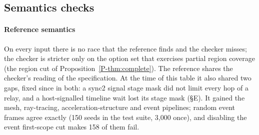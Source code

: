 \documentclass[acmtog,anonymous,review]{acmart}
\begin{document}
\subsection{Semantics checks}
\label{sec:eval-sem}

\begin{table}[htbp]
\caption{Checker vs.\ executable reference semantics, early checker around the tutorial-study snapshot (dev), R1 in
both. ``Violations'': reference races the checker misses. The release against the reference is in the paper
(\S\ref{P-sec:eval-sem}).}
\label{tab:ref}
\small
{}
\end{table}

\paragraph{Reference semantics}
On every input there is no race that the reference finds and the checker misses; the checker is stricter only on the
option set that exercises partial region coverage (the region cut of Proposition~\ref{P-thm:complete}). The reference
shares the checker's reading of the specification. At the time of this table it also shared two gaps, fixed since in
both: a sync2 signal stage mask did not limit every hop of a relay, and a host-signalled timeline wait lost its stage
mask (\S E). It gained the mesh, ray-tracing,
acceleration-structure and event pipelines; random event frames agree exactly (150 seeds in the test suite, 3,000 once),
and disabling the event first-scope cut makes 158 of them fail.
\end{document}
